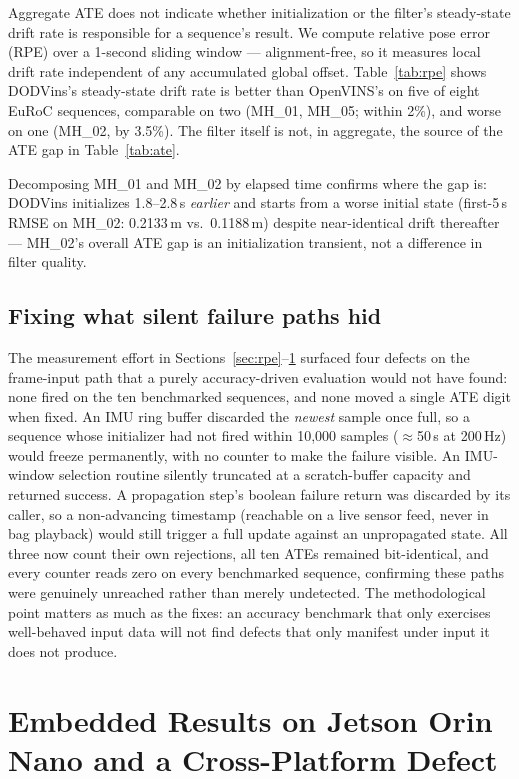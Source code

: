 \documentclass[10pt,conference,letterpaper]{IEEEtran}
\begin{document}
Aggregate ATE does not indicate whether initialization or the filter's
steady-state drift rate is responsible for a sequence's result. We compute
relative pose error (RPE) over a 1-second sliding window --- alignment-free,
so it measures local drift rate independent of any accumulated global
offset. Table~\ref{tab:rpe} shows DODVins's
steady-state drift rate is better than OpenVINS's on five of eight EuRoC
sequences, comparable on two (MH\_01, MH\_05; within 2\%), and worse on one
(MH\_02, by 3.5\%). The filter itself is not, in aggregate, the source of
the ATE gap in Table~\ref{tab:ate}.

Decomposing MH\_01 and MH\_02 by elapsed time confirms where the gap is:
DODVins initializes 1.8--2.8\,s \emph{earlier} and starts from a worse
initial state (first-5\,s RMSE on MH\_02: 0.2133\,m vs.\ 0.1188\,m)
despite near-identical drift thereafter --- MH\_02's overall ATE gap is an
initialization transient, not a difference in filter quality.

\subsection{Fixing what silent failure paths hid}

The measurement effort in Sections~\ref{sec:rpe}--\ref{sec:embedded}
surfaced four defects on the frame-input path that a purely accuracy-driven
evaluation would not have found: none fired on the ten benchmarked
sequences, and none moved a single ATE digit when fixed. An IMU ring buffer
discarded the \emph{newest} sample once full, so a sequence whose
initializer had not fired within 10{,}000 samples ($\approx$50\,s at
200\,Hz) would freeze permanently, with no counter to make the failure visible. An IMU-window selection routine silently
truncated at a scratch-buffer capacity and returned success. A propagation
step's boolean failure return was discarded by its caller, so a
non-advancing timestamp (reachable on a live sensor feed, never in bag
playback) would still trigger a full update against an unpropagated state.
All three now count their own rejections, all ten ATEs remained
bit-identical, and every counter reads zero on every benchmarked sequence,
confirming these paths were genuinely unreached rather than merely
undetected. The methodological point matters as much as the fixes: an
accuracy benchmark that only exercises well-behaved input data will not
find defects that only manifest under input it does not produce.

\section{Embedded Results on Jetson Orin Nano and a Cross-Platform Defect}
\label{sec:embedded}
\end{document}
